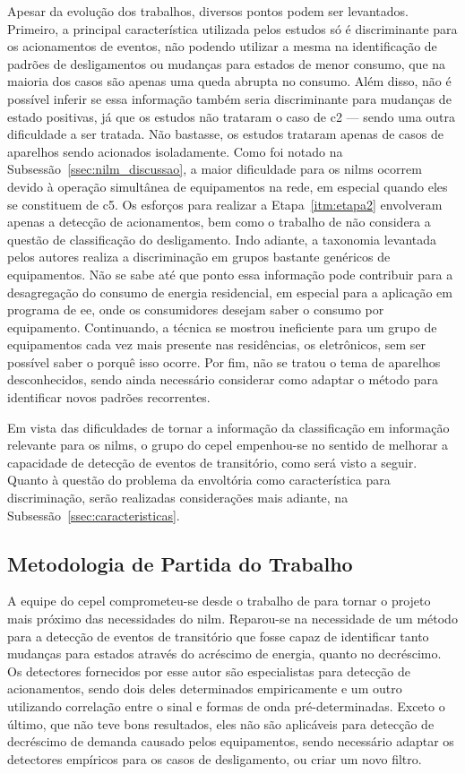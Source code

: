 Apesar da evolução dos trabalhos, diversos pontos podem ser
levantados. Primeiro, a principal característica utilizada pelos
estudos só é discriminante para os acionamentos de eventos, não
podendo utilizar a mesma na identificação de padrões de desligamentos
ou mudanças para estados de menor consumo, que na maioria dos casos
são apenas uma queda abrupta no consumo.  Além disso, não é possível
inferir se essa informação também seria discriminante para mudanças de
estado positivas, já que os estudos não trataram o caso de \gls{c2}
--- sendo uma outra dificuldade a ser tratada. Não bastasse, os
estudos trataram apenas de casos de aparelhos sendo acionados
isoladamente. Como foi notado na Subsessão~\ref{ssec:nilm_discussao},
a maior dificuldade para os \glspl{nilm} ocorrem devido à
operação simultânea de equipamentos na rede, em especial quando eles
se constituem de \gls{c5}. Os esforços para realizar a
Etapa~\ref{itm:etapa2} envolveram apenas a detecção de acionamentos,
bem como o trabalho de \cite{nilm_cepel_alvaro} não considera a
questão de classificação do desligamento. Indo adiante, a taxonomia
levantada pelos autores realiza a discriminação em grupos bastante
genéricos de equipamentos.  Não se sabe até que ponto essa informação
pode contribuir para a desagregação do consumo de energia residencial,
em especial para a aplicação em programa de \gls{ee}, onde os
consumidores desejam saber o consumo por equipamento. Continuando, a
técnica se mostrou ineficiente para um grupo de equipamentos cada vez
mais presente nas residências, os eletrônicos, sem ser possível saber
o porquê isso ocorre. Por fim, não se tratou o tema de aparelhos
desconhecidos, sendo ainda necessário considerar como adaptar o método
para identificar novos padrões recorrentes.

Em vista das dificuldades de tornar a informação da classificação em
informação relevante para os \glspl{nilm}, o grupo do \gls{cepel}
empenhou-se no sentido de melhorar a capacidade de detecção de eventos
de transitório, como será visto a seguir. Quanto à questão do
problema da envoltória como característica para discriminação, serão
realizadas considerações mais adiante, na
Subsessão~\ref{ssec:caracteristicas}.

\subsection{Metodologia de Partida do Trabalho}
\label{ssec:met_cepel}

A equipe do \gls{cepel} comprometeu-se desde o trabalho de
\citeauthor*{nilm_cepel_alvaro} para tornar o projeto mais próximo das
necessidades do \gls{nilm}. Reparou-se na necessidade de um
método para a detecção de eventos de transitório que fosse capaz de
identificar tanto mudanças para estados através do acréscimo de
energia, quanto no decréscimo. Os detectores fornecidos por esse autor
são especialistas para detecção de acionamentos, sendo dois deles
determinados empiricamente e um outro utilizando correlação entre o
sinal e formas de onda pré-determinadas. Exceto o último, que não teve
bons resultados, eles não são aplicáveis para detecção de decréscimo
de demanda causado pelos equipamentos, sendo necessário adaptar os
detectores empíricos para os casos de desligamento, ou criar um novo
filtro. 


